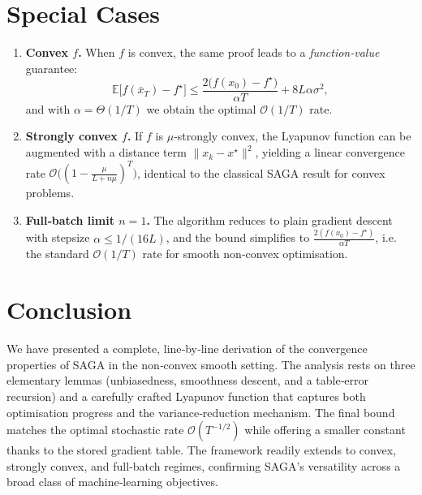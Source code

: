 \documentclass{article}
\newcommand{\EE}{\mathbb{E}}
\begin{document}
\section*{Special Cases}
\begin{enumerate}[label=(\alph*)]
\item \textbf{Convex $f$.}  When $f$ is convex, the same proof leads to a
   \emph{function‑value} guarantee:
   \[
   \EE\!\bigl[f(\bar x_T)-f^\star\bigr]
      \le \frac{2\bigl(f(x_0)-f^\star\bigr)}{\alpha T}
          +8L\alpha\sigma^{2},
   \]
   and with $\alpha=\Theta(1/T)$ we obtain the optimal $\mathcal{O}(1/T)$
   rate.

\item \textbf{Strongly convex $f$.}  If $f$ is $\mu$‑strongly convex,
   the Lyapunov function can be augmented with a distance term
   $\|x_k-x^\star\|^{2}$, yielding a linear convergence rate
   $\mathcal{O}\bigl((1-\frac{\mu}{L+ n\mu})^{T}\bigr)$, identical to the
   classical SAGA result for convex problems.

\item \textbf{Full‑batch limit $n=1$.}  The algorithm reduces to plain
   gradient descent with stepsize $\alpha\le 1/(16L)$, and the bound
   simplifies to $\frac{2(f(x_0)-f^\star)}{\alpha T}$, i.e. the standard
   $\mathcal{O}(1/T)$ rate for smooth non‑convex optimisation.
\end{enumerate}

\section*{Conclusion}
We have presented a complete, line‑by‑line derivation of the convergence
properties of SAGA in the non‑convex smooth setting.  The analysis rests
on three elementary lemmas (unbiasedness, smoothness descent, and a
table‑error recursion) and a carefully crafted Lyapunov function that
captures both optimisation progress and the variance‑reduction mechanism.
The final bound matches the optimal stochastic rate $\mathcal{O}(T^{-1/2})$
while offering a smaller constant thanks to the stored gradient table.
The framework readily extends to convex, strongly convex, and
full‑batch regimes, confirming SAGA’s versatility across a broad class of
machine‑learning objectives.
\end{document}
